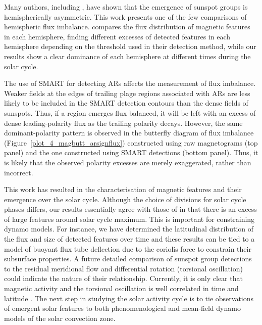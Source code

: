 Many authors, including \citet{Temmer:2006}, have shown that the emergence of sunspot groups is hemispherically asymmetric. This work presents one of the few comparisons of hemispheric flux imbalance. \citet{meunier:2003} compares the flux distribution of magnetic features in each hemisphere, finding different excesses of detected features in each hemisphere depending on the threshold used in their detection method, while our results show a clear dominance of each hemisphere at different times during the solar cycle.

The use of \gls{SMART} for detecting \glspl{AR} affects the measurement of flux imbalance. Weaker fields at the edges of trailing plage regions associated with \glspl{AR} are less likely to be included in the \gls{SMART} detection contours than the dense fields of sunspots. Thus, if a region emerges flux balanced, it will be left with an excess of dense leading-polarity flux as the trailing polarity decays. However, the same dominant-polarity pattern is observed in the butterfly diagram of flux imbalance (Figure~\ref{plot_4_magbutt_arsignflux}) constructed using raw magnetograms (top panel) and the one constructed using \gls{SMART} detections (bottom panel). Thus, it is likely that the observed polarity excesses are merely exaggerated, rather than incorrect.  


This work has resulted in the characterisation of magnetic features and their emergence over the solar cycle. Although the choice of divisions for solar cycle phases differs, our results essentially agree with those of \cite{meunier:2003} in that there is an excess of large features around solar cycle maximum. This is important for constraining dynamo models. For instance, we have determined the latitudinal distribution of the flux and size of detected features over time and these results can be tied to a model of buoyant flux tube deflection due to the coriolis force to constrain their subsurface properties. A future detailed comparison of sunspot group detections to the residual meridional flow and differential rotation (torsional oscillation) could indicate the nature of their relationship. Currently, it is only clear that magnetic activity and the torsional oscillation is  well correlated in time and latitude \citep{Hathaway:2011}. The next step in studying the solar activity cycle is to tie observations of emergent solar features to both phenomenological and mean-field dynamo models of the solar convection zone. 




